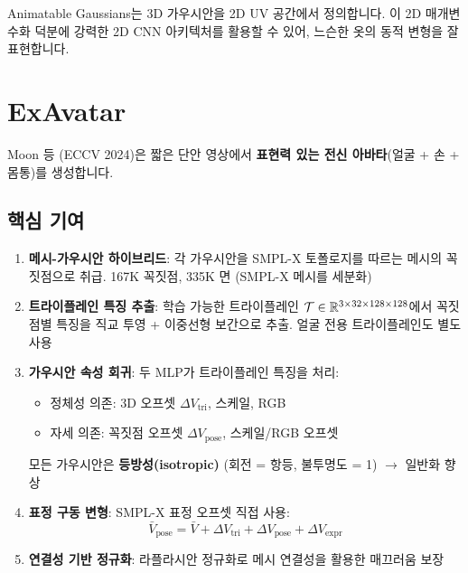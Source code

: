 \documentclass[11pt, a4paper]{report}
\begin{document}
\begin{importantnote}
Animatable Gaussians는 3D 가우시안을 2D UV 공간에서 정의합니다. 이 2D 매개변수화 덕분에 강력한 2D CNN 아키텍처를 활용할 수 있어, 느슨한 옷의 동적 변형을 잘 표현합니다.
\end{importantnote}


\section{ExAvatar}

Moon 등 (ECCV 2024)은 짧은 단안 영상에서 \textbf{표현력 있는 전신 아바타}(얼굴 + 손 + 몸통)를 생성합니다.

\subsection{핵심 기여}

\begin{enumerate}[leftmargin=*]
  \item \textbf{메시-가우시안 하이브리드}: 각 가우시안을 SMPL-X 토폴로지를 따르는 메시의 꼭짓점으로 취급. 167K 꼭짓점, 335K 면 (SMPL-X 메시를 세분화)

  \item \textbf{트라이플레인 특징 추출}: 학습 가능한 트라이플레인 $\mathcal{T} \in \mathbb{R}^{3 \times 32 \times 128 \times 128}$에서 꼭짓점별 특징을 직교 투영 + 이중선형 보간으로 추출. 얼굴 전용 트라이플레인도 별도 사용

  \item \textbf{가우시안 속성 회귀}: 두 MLP가 트라이플레인 특징을 처리:
  \begin{itemize}[leftmargin=*]
    \item 정체성 의존: 3D 오프셋 $\Delta V_{\text{tri}}$, 스케일, RGB
    \item 자세 의존: 꼭짓점 오프셋 $\Delta V_{\text{pose}}$, 스케일/RGB 오프셋
  \end{itemize}
  모든 가우시안은 \textbf{등방성(isotropic)} (회전 = 항등, 불투명도 = 1) $\rightarrow$ 일반화 향상

  \item \textbf{표정 구동 변형}: SMPL-X 표정 오프셋 직접 사용:
  \begin{equation}
    \bar{V}_{\text{pose}} = \bar{V} + \Delta V_{\text{tri}} + \Delta V_{\text{pose}} + \Delta V_{\text{expr}}
  \end{equation}

  \item \textbf{연결성 기반 정규화}: 라플라시안 정규화로 메시 연결성을 활용한 매끄러움 보장
\end{enumerate}
\end{document}
